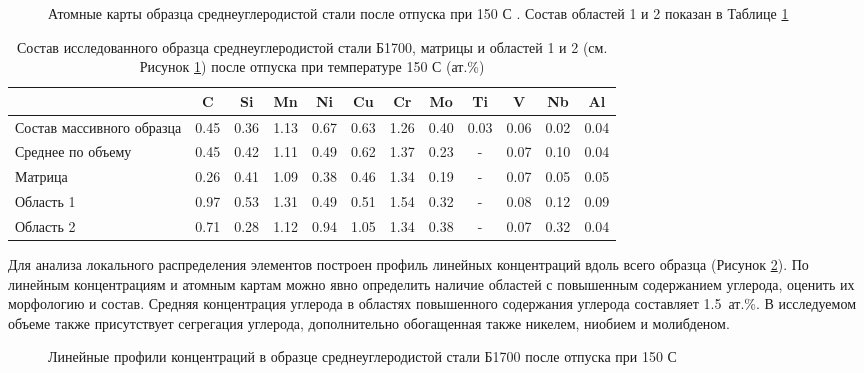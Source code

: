 \begin{figure}[ht]
	\caption{Атомные карты образца среднеуглеродистой стали после отпуска при 150 \textdegree С \cite{scbibRyabov}. Состав областей 1 и 2 показан в Таблице \cref{tab:SteelComposition150} }
	\label{fig:SteelAtomMaps1}
\end{figure} 

\begin{table} [htbp]
	\centering
	\caption{Состав исследованного образца среднеуглеродистой стали Б1700, матрицы и областей 1 и 2 (см. Рисунок \cref{fig:SteelAtomMaps1}) после отпуска при температуре 150 \textdegree С (ат.\%)}%
	\label{tab:SteelComposition150}%
	\begin{SingleSpace}
		\begin{tabular}{|p{3cm}| c | c | c | c | c | c | c | c | c | c | c |}
			\hline
			& C & Si & Mn & Ni & Cu & Cr & Mo & Ti & V & Nb & Al     \\ \hline
			Состав массивного образца     & 0.45 & 0.36 & 1.13 & 0.67 & 0.63 & 1.26 & 0.40 & 0.03 & 0.06 & 0.02 & 0.04   \\ \hline
			Среднее по объему   & 0.45 & 0.42 & 1.11 & 0.49 & 0.62 & 1.37 & 0.23 & - & 0.07 & 0.10 & 0.04   \\  \hline		
			Матрица   & 0.26 & 0.41 & 1.09 & 0.38 & 0.46 & 1.34 & 0.19 & - & 0.07 & 0.05 & 0.05   \\  \hline	
			Область 1   & 0.97 & 0.53 & 1.31 & 0.49 & 0.51 & 1.54 & 0.32 & - & 0.08 & 0.12 & 0.09   \\  \hline
			Область 2   & 0.71 & 0.28 & 1.12 & 0.94 & 1.05 & 1.34 & 0.38 & - & 0.07 & 0.32 & 0.04   \\  \hline	
		\end{tabular}%
	\end{SingleSpace}
\end{table}

Для анализа локального распределения элементов построен профиль линейных концентраций вдоль всего образца (Рисунок \cref{fig:SteelLinear1}). По линейным концентрациям и атомным картам можно явно определить наличие областей с повышенным содержанием углерода, оценить их морфологию и состав. Средняя концентрация углерода в областях повышенного содержания углерода составляет 1.5~ат.\%. В исследуемом объеме также присутствует сегрегация углерода, дополнительно обогащенная также никелем, ниобием и молибденом.

\begin{figure}[ht]
	\caption{Линейные профили концентраций в образце среднеуглеродистой стали Б1700 после отпуска при 150 \textdegree С \cite{scbibRyabov}}
	\label{fig:SteelLinear1}
\end{figure}

